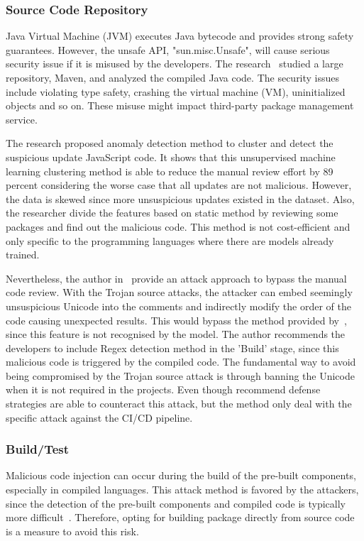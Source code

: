 \subsubsection{Source Code Repository}
Java Virtual Machine (JVM) executes Java bytecode and provides strong safety
guarantees. However, the unsafe API, "sun.misc.Unsafe", will cause serious 
security issue if it is misused by the developers. The research~\cite{mastrangelo2015use} 
studied a large repository, Maven, and analyzed the compiled Java code. The 
security issues include violating type safety, crashing the virtual machine (VM), 
uninitialized objects and so on. These misuse might impact third-party package 
management service. 

The research\cite{garrett2019detecting} proposed anomaly detection method to cluster and detect 
the suspicious update JavaScript code. It shows that this unsupervised machine learning 
clustering method is able to reduce the manual review effort by 89 percent considering the worse
case that all updates are not malicious. However, the data is skewed since more unsuspicious updates
existed in the dataset. Also, the researcher divide the features based on static method by reviewing
some packages and find out the malicious code. This method is not cost-efficient and only specific
to the programming languages where there are models already trained. 

Nevertheless, the author in~\cite{boucher2023trojan} provide an attack approach to bypass the manual
code review. With the Trojan source attacks, the attacker can embed seemingly unsuspicious Unicode into
the comments and indirectly modify the order of the code causing unexpected results. 
This would bypass the method provided by~\cite{garrett2019detecting}, 
since this feature is not recognised by the model. The author recommends the developers to include 
Regex detection method in the 'Build' stage, since this malicious code is triggered by the compiled code.
The fundamental way to avoid being compromised by the Trojan source attack is through banning the 
Unicode when it is not required in the projects. Even though recommend defense strategies 
are able to counteract this attack, but the method only deal with the specific attack against the 
CI/CD pipeline.

\subsubsection{Build/Test}
Malicious code injection can occur during the build of the pre-built components, especially in compiled languages.
This attack method is favored by the attackers, since the detection of the pre-built components and compiled code is 
typically more difficult~\cite{ladisa2023journey}. Therefore, opting for building package directly from 
source code is a measure to avoid this risk.


